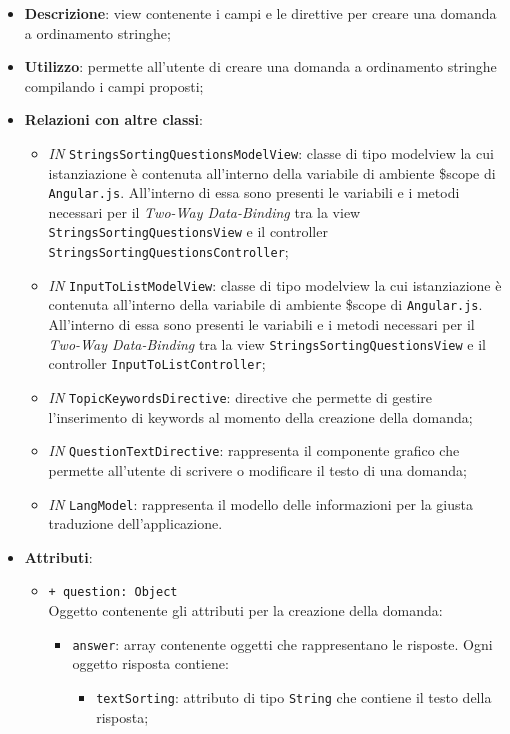 \begin{itemize}
	\item \textbf{Descrizione}: view contenente i campi e le direttive per creare una domanda a ordinamento stringhe;
	\item \textbf{Utilizzo}: permette all'utente di creare una domanda a ordinamento stringhe compilando i campi proposti;
	\item \textbf{Relazioni con altre classi}:
		\begin{itemize}
			\item \textit{IN} \texttt{StringsSortingQuestionsModelView}: classe di tipo modelview la cui istanziazione è contenuta all'interno della variabile di ambiente \$scope di \texttt{Angular.js}. All'interno di essa sono presenti le variabili e i metodi necessari per il \textit{Two-Way Data-Binding} tra la view \texttt{StringsSortingQuestionsView} e il controller \texttt{StringsSortingQuestionsController};
			\item \textit{IN} \texttt{InputToListModelView}: classe di tipo modelview la cui istanziazione è contenuta all'interno della variabile di ambiente \$scope di \texttt{Angular.js}. All'interno di essa sono presenti le variabili e i metodi necessari per il \textit{Two-Way Data-Binding} tra la view \texttt{StringsSortingQuestionsView} e il controller \texttt{InputToListController};
			\item \textit{IN} \texttt{TopicKeywordsDirective}: directive che permette di gestire l'inserimento di keywords al momento della creazione della domanda;
			\item \textit{IN} \texttt{QuestionTextDirective}: rappresenta il componente grafico che permette all'utente di scrivere o modificare il testo di una domanda;
			\item \textit{IN} \texttt{LangModel}: rappresenta il modello delle informazioni per la giusta traduzione dell'applicazione.
		\end{itemize}
	\item \textbf{Attributi}:
	\begin{itemize}
		\item \texttt{+ question: Object} \\ Oggetto contenente gli attributi per la creazione della domanda:
		\begin{itemize}
			\item \texttt{answer}: array contenente oggetti che rappresentano le risposte. Ogni oggetto risposta contiene:
			\begin{itemize}
				\item \texttt{textSorting}: attributo di tipo \texttt{String} che contiene il testo della risposta;

\end{itemize}
\end{itemize}
\end{itemize}
\end{itemize}
